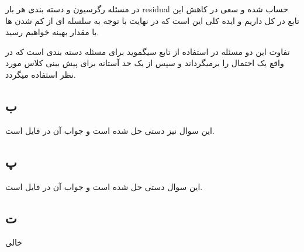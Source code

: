 \documentclass{article}[12pt]
\begin{document}
در مسئله رگرسیون  و دسته بندی هر بار residual حساب شده و سعی در کاهش این تابع در کل داریم و ایده کلی این است که در نهایت با توجه به سلسله ای از کم شدن ها با مقدار بهینه خواهیم رسید. 

تفاوت این دو مسئله در استفاده از تابع سیگموید برای مسئله دسته بندی است که در واقع یک احتمال را برمیگرداند و سپس از یک حد آستانه برای پیش بینی کلاس مورد نظر استفاده میگردد.

\subsection{ب}
این سوال نیز دستی حل شده است و جواب آن در فایل 
است.
\subsection{پ}
 این سوال دستی حل شده است و جواب آن در فایل 
 است. 
\subsection{ت}
خالی
\end{document}
